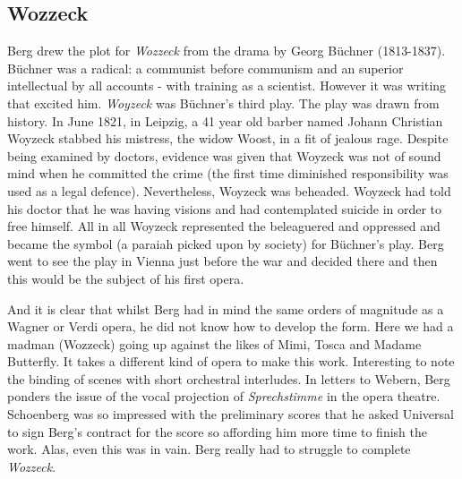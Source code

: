 \subsection{Wozzeck}
Berg drew the plot for \textit{Wozzeck} from the drama by Georg B\"uchner (1813-1837). B\"uchner was a radical: a communist before communism and an superior intellectual by all accounts - with training as a scientist. However it was writing that excited him. \textit{Woyzeck} was B\"uchner's third play. The play was drawn from history. In June 1821, in Leipzig, a 41 year old barber named Johann Christian Woyzeck stabbed his mistress, the widow Woost, in a fit of jealous rage. Despite being examined by doctors, evidence was given that Woyzeck was not of sound mind when he committed the crime (the first time diminished responsibility was used as a legal defence). Nevertheless, Woyzeck was beheaded. Woyzeck had told his doctor that he was having visions and had contemplated suicide in order to free himself. All in all Woyzeck represented the beleaguered and oppressed and became the symbol (a paraiah picked upon by society) for B\"uchner's play. Berg went to see the play in Vienna just before the war and decided there and then this would be the subject of his first opera.

And it is clear that whilst Berg had in mind the same orders of magnitude as a Wagner or Verdi opera, he did not know how to develop the form. Here we had a madman (Wozzeck) going up against the likes of Mimi, Tosca and Madame Butterfly. It takes a different kind of opera to make this work. Interesting to note the binding of scenes with short orchestral interludes. In letters to Webern, Berg ponders the issue of the vocal projection of \textit{Sprechstimme} in the opera theatre. Schoenberg was so impressed with the preliminary scores that he asked Universal to sign Berg's contract for the score so affording him more time to finish the work. Alas, even this was in vain. Berg really had to struggle to complete \textit{Wozzeck}. 

